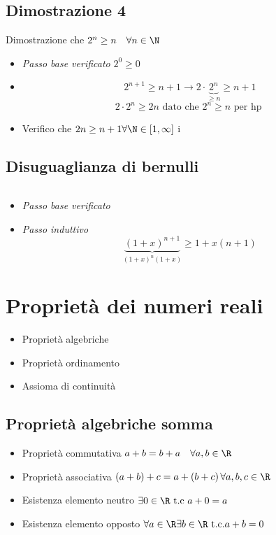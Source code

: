 \subsection{Dimostrazione 4}
\label{sub:dimostrazione4}

Dimostrazione che $2^{n} \ge n \quad \forall n  \in  \N$
\begin{itemize}
	\item \textit{Passo base verificato} $2^{0} \ge 0$
	\item \[
		      2^{n+1} \ge n+1 \rightarrow 2 \cdot \underbrace{2^{n}}_{\ge n} \ge n+1
	      \]
	      \[
		      2 \cdot 2 ^{n} \ge 2n \text{ dato che  } 2^{n} \ge n \text{ per hp }
	      \]
	\item Verifico che $2n \ge n+1 \forall \N  \in \left[ 1, \infty \right] $
	      i
\end{itemize}
\subsection{Disuguaglianza di bernulli}
\label{sub:disbernoulli}
\[
\]
\begin{itemize}
	\item \textit{Passo base verificato}
	\item \textit{Passo induttivo} \[
		      \underbrace{\left( 1+x \right) ^{n+1}}_{ \left( 1+x \right) ^{n} \left( 1+x \right) } \ge 1+x\left( n+1 \right)
	      \]
\end{itemize}
\section{Proprietà dei numeri reali}
\label{sec:proprietàdeinumerireali}
\begin{itemize}
	\item Proprietà algebriche
	\item Proprietà ordinamento
	\item Assioma di continuità
\end{itemize}
\subsection{Proprietà algebriche somma}
\label{sub:proprietàalgebriche}
\begin{itemize}
	\item Proprietà commutativa $a+b=b+a \quad \forall a,b  \in \R$
	\item Proprietà associativa $\left( a+b \right) +c = a+ \left( b+c \right) \forall a,b,c  \in  \R$
	\item Esistenza elemento neutro $\exists 0  \in  \R \text{ t.c } a+0=a$
	\item Esistenza elemento opposto $\forall a  \in  \R \exists b  \in  \R \text{ t.c.} a+b=0$
\end{itemize}
